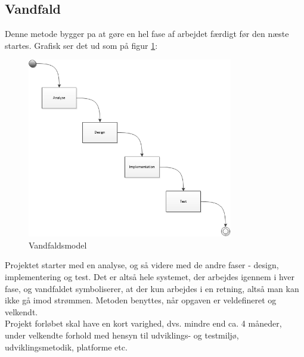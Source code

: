 \subsection{Vandfald}\label{Vandfald}
Denne metode bygger pa at gøre en hel fase af arbejdet færdigt før den næste startes. Grafisk ser det ud som på figur \ref{Vandfaldsmodel}: \\

\begin{figure}[H]
	\centering
	\includegraphics[width=0.8\textwidth]{Figurer/Metode/Vandfald}
	\caption{Vandfaldsmodel}
	\label{Vandfaldsmodel}
\end{figure}
Projektet starter med en analyse, og så videre med de andre faser - design, implementering og test. Det er altså hele systemet, der arbejdes igennem i hver fase, og vandfaldet symboliserer, at der kun arbejdes i en retning, altså man kan ikke gå imod strømmen. Metoden benyttes, når opgaven er veldefineret og velkendt. \\
Projekt forløbet skal have en kort varighed, dvs. mindre end ca. 4 måneder, under velkendte forhold med hensyn til udviklings- og testmiljø, udviklingsmetodik, platforme etc. \cite{Projektledelse}

